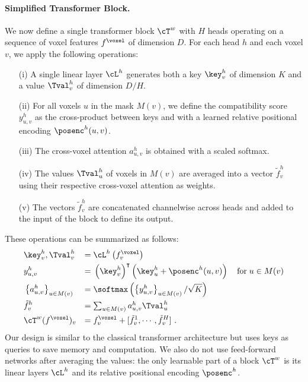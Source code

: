 \documentclass[runningheads]{tpls/llncs}
\begin{document}
\paragraph{Simplified Transformer Block.} We now define a single transformer block $\cT^w$ with $H$ heads operating on a sequence of voxel features $f^\voxel$ of dimension $D$. For each head $h$ and each voxel $v$, we apply the following operations: 
\begin{itemize}[leftmargin=8mm]
\item [(i)] A single linear layer $\cL^h$ generates both a key $\key_v^h$ of dimension $K$ and a value $\Tval_v^h$ of dimension $D/H$.
\item [(ii)] For all voxels $u$ in the mask $M(v)$, we define the compatibility score $y_{u,v}^h$ as the cross-product between keys and with a learned relative positional encoding $\posenc^h(u,v)$.
\item [(iii)] The cross-voxel attention $a^h_{u,v}$ is obtained with a scaled softmax.
\item [(iv)] The values $\Tval_u^h$ of voxels in $M(v)$ are averaged into a vector $\tilde{f}_v^h$ using their respective cross-voxel attention as weights.
\item [(v)] The vectors $\tilde{f}_v^h$ are concatenated channelwise across heads and added to the input of the block to define its output.
\end{itemize}
These operations can be summarized as follows:
\begin{alignat}{3}
    \hfill
    & \key_v^h, \Tval_v^h
    & =\; & \cL^h\left(f^\voxel_v\right) \label{eq:trans}\\
    \hfill
    & y_{u,v}^h
    & =\; & \left(\key_v^h\right)^\intercal \left(\key_u^h+ \posenc^h(u,v)\right) \quad \text{for} \; u \in M(v) \label{eq:compat}\\
    \hfill
    & \left\{a_{u,v}^h\right\}_{u \in M(v)}
    & =\; & \softmax\left(\left\{y_{u,v}^h\right\}_{u \in M(v)} / \sqrt{K}\right) \label{eq:attention }\\
    \hfill
    & \tilde{f}_v^h
    & =\; & \textstyle{\sum_{u \in M(v)} a_{u,v}^h\Tval_u^{h}} \\
    \hfill
    & \cT^w(f^\voxel)_v& =\; & f^\voxel_v + [\tilde{f}_v^{1}, \cdots, \tilde{f}_v^{H}]~.
\end{alignat}
Our design is similar to the classical transformer architecture but uses keys as queries to save memory and computation. We also do not use feed-forward networks after averaging the values: the only learnable part of a block $\cT^w$ is its linear layers $\cL^h$ and its relative positional encoding $\posenc^h$. 
\end{document}
